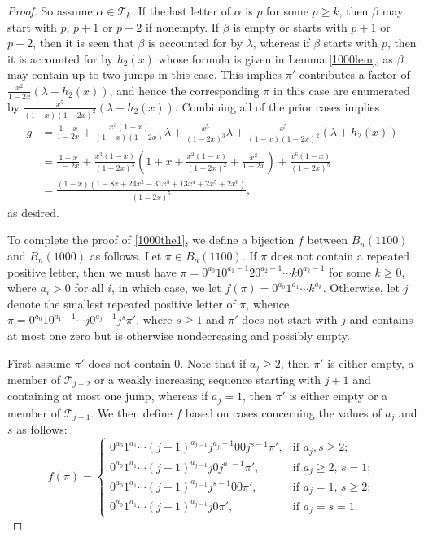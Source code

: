 \documentclass{article}
\theoremstyle{remark}
\theoremstyle{plain}
\begin{document}
\begin{proof}
So assume $\alpha \in \mathcal{T}_k$. If the last letter of $\alpha$ is $p$ for some $p \geq k$, then $\beta$ may start with $p$, $p+1$ or $p+2$ if nonempty.  If $\beta$ is empty or starts with $p+1$ or $p+2$, then it is seen that $\beta$ is accounted for by $\lambda$, whereas if $\beta$ starts with $p$, then it is accounted for by $h_2(x)$ whose formula is given in Lemma \ref{1000lem}, as $\beta$ may contain up to two jumps in this case.  This implies $\pi'$ contributes a factor of $\frac{x^2}{1-2x}(\lambda+h_2(x))$, and hence the corresponding $\pi$ in this case are enumerated by $\frac{x^5}{(1-x)(1-2x)^2}(\lambda+h_2(x))$. Combining all of the prior cases implies
\begin{align*}
g&=\frac{1-x}{1-2x}+\frac{x^3(1+x)}{(1-x)(1-2x)}\lambda+\frac{x^5}{(1-2x)^3}\lambda+\frac{x^5}{(1-x)(1-2x)^2}(\lambda+h_2(x))\\
&=\frac{1-x}{1-2x}+\frac{x^3(1-x)}{(1-2x)^3}\left(1+x+\frac{x^2(1-x)}{(1-2x)^2}+\frac{x^2}{1-2x}\right)+\frac{x^6(1-x)}{(1-2x)^5}\\
&=\frac{(1-x)(1-8x+24x^2-31x^3+13x^4+2x^5+2x^6)}{(1-2x)^5},
\end{align*}
as desired.

To complete the proof of \eqref{1000the1}, we define a bijection $f$ between $B_n(1100)$ and $B_n(1000)$ as follows.  Let $\pi \in B_n(1100)$. If $\pi$ does not contain a repeated positive letter, then we must have $\pi=0^{a_0}10^{a_1-1}20^{a_2-1}\cdots k0^{a_k-1}$ for some $k \geq0$, where $a_i>0$ for all $i$, in which case, we let $f(\pi)=0^{a_0}1^{a_1}\cdots k^{a_k}$.  Otherwise, let $j$ denote the smallest repeated positive letter of $\pi$, whence
$\pi=0^{a_0}10^{a_1-1}\cdots j0^{a_{j}-1}j^s\pi'$, where $s \geq 1$ and $\pi'$ does not start with $j$ and contains at most one zero but is otherwise nondecreasing and possibly empty.

First assume $\pi'$ does not contain 0.  Note that if $a_j\geq 2$, then $\pi'$ is either empty, a member of $\mathcal{T}_{j+2}$ or a weakly increasing sequence starting with $j+1$ and containing at most one jump, whereas if $a_j=1$, then $\pi'$ is either empty or a member of $\mathcal{T}_{j+1}$. We then define $f$ based on cases concerning the values of $a_j$ and $s$ as follows:
$$
f(\pi) = \begin{cases}
0^{a_0}1^{a_1}\cdots(j-1)^{a_{j-1}}j^{a_j-1}00j^{s-1}\pi', & \text{if } a_j,s\geq 2; \\
0^{a_0}1^{a_1}\cdots(j-1)^{a_{j-1}}j0j^{a_j-1}\pi', & \text{if }a_j\geq2,\,s=1; \\
0^{a_0}1^{a_1}\cdots(j-1)^{a_{j-1}}j^{s-1}00\pi', & \text{if } a_j=1,\,s\geq 2;\\
0^{a_0}1^{a_1}\cdots(j-1)^{a_{j-1}}j0\pi',  & \text{if } a_j=s=1.
\end{cases}
$$


\end{proof}
\end{document}
